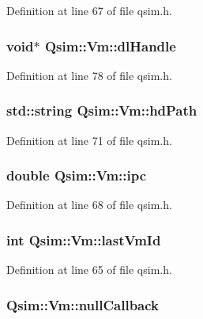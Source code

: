 Definition at line 67 of file qsim.h.
\subsubsection[{dlHandle}]{\setlength{\rightskip}{0pt plus 5cm}void$\ast$ {\bf Qsim::Vm::dlHandle}\hspace{0.3cm}{\tt  [private]}}\label{classQsim_1_1Vm_08437076c5b25329e4977b9fb4d18a6c}




Definition at line 78 of file qsim.h.
\subsubsection[{hdPath}]{\setlength{\rightskip}{0pt plus 5cm}std::string {\bf Qsim::Vm::hdPath}\hspace{0.3cm}{\tt  [private]}}\label{classQsim_1_1Vm_d4aa9c6cee669325ee902bd5019bf059}




Definition at line 71 of file qsim.h.
\subsubsection[{ipc}]{\setlength{\rightskip}{0pt plus 5cm}double {\bf Qsim::Vm::ipc}\hspace{0.3cm}{\tt  [private]}}\label{classQsim_1_1Vm_587a8509bccbca5c1dd5f6bd93e2c766}




Definition at line 68 of file qsim.h.
\subsubsection[{lastVmId}]{\setlength{\rightskip}{0pt plus 5cm}int {\bf Qsim::Vm::lastVmId}\hspace{0.3cm}{\tt  [static, private]}}\label{classQsim_1_1Vm_b55de0128958cf755f50090a277de884}




Definition at line 65 of file qsim.h.
\subsubsection[{nullCallback}]{ {\bf Qsim::Vm::nullCallback}\hspace{0.3cm}{\tt  [static, private]}}\label{classQsim_1_1Vm_58a13ae54b2dd7a70e40ee61e36069d7}




